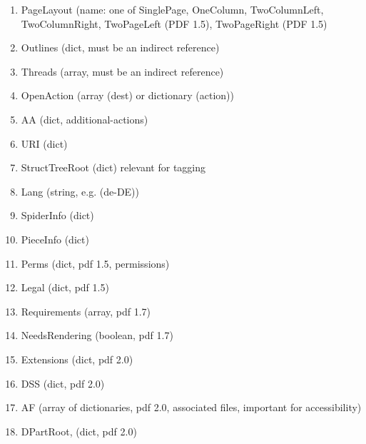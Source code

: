 \documentclass{article}
\begin{document}
\begin{itemize}
\begin{enumerate}
  \item PageLayout (name: one of SinglePage, OneColumn,
  TwoColumnLeft, TwoColumnRight, TwoPageLeft (PDF 1.5), TwoPageRight (PDF 1.5)
  \item Outlines (dict, must be an indirect reference)
  \item Threads (array, must be an indirect reference)
  \item OpenAction (array (dest) or dictionary (action))
  \item AA (dict, additional-actions)
  \item URI (dict)
  \item StructTreeRoot (dict) relevant for tagging

  \item Lang (string, e.g. (de-DE))
  \item SpiderInfo (dict)
  \item PieceInfo (dict)

  \item Perms (dict, pdf 1.5, permissions)
  \item Legal (dict, pdf 1.5)
  \item Requirements (array, pdf 1.7)

  \item NeedsRendering (boolean, pdf 1.7)
  \item Extensions (dict, pdf 2.0)
  \item DSS (dict, pdf 2.0)
  \item AF (array of dictionaries, pdf 2.0, associated files, important for accessibility)
  \item DPartRoot, (dict, pdf 2.0)
\end{enumerate}
\end{itemize}
\end{document}
